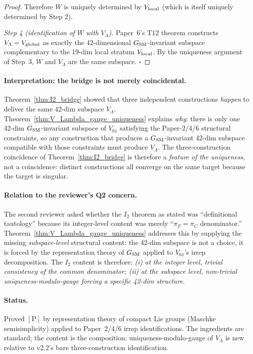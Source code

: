 \documentclass[11pt]{article}
\theoremstyle{plain}
\theoremstyle{definition}
\theoremstyle{remark}
\begin{document}
\begin{proof}
Therefore $W$ is uniquely determined by $V_{\rm local}$ (which is itself uniquely determined by Step 2).

\medskip

\emph{Step 4 (identification of $W$ with $V_\Lambda$).}  Paper~6's T12 theorem constructs $V_\Lambda = V_{\rm global}$ as exactly the 42-dimensional $G_{\rm SM}$-invariant subspace complementary to the 19-dim local stratum $V_{\rm local}$.  By the uniqueness argument of Step~3, $W$ and $V_\Lambda$ are the same subspace.  $\square$
\end{proof}

\paragraph{Interpretation: the bridge is not merely coincidental.}  Theorem~\ref{thm:I2_bridge} showed that three independent constructions \emph{happen} to deliver the same 42-dim subspace $V_\Lambda$.  Theorem~\ref{thm:V_Lambda_gauge_uniqueness} explains \emph{why}: there is only one 42-dim $G_{\rm SM}$-invariant subspace of $V_{61}$ satisfying the Paper-2/4/6 structural constraints, so any construction that produces a $G_{\rm SM}$-invariant 42-dim subspace compatible with those constraints must produce $V_\Lambda$.  The three-construction coincidence of Theorem~\ref{thm:I2_bridge} is therefore a \emph{feature of the uniqueness}, not a coincidence: distinct constructions all converge on the same target because the target is singular.

\paragraph{Relation to the reviewer's Q2 concern.}  The second reviewer asked whether the $I_2$ theorem as stated was ``definitional tautology'' because its integer-level content was merely ``$\pi_F = \pi_C$ denominator.''  Theorem~\ref{thm:V_Lambda_gauge_uniqueness} addresses this by supplying the missing \emph{subspace-level} structural content: the 42-dim subspace is not a choice, it is forced by the representation theory of $G_{\rm SM}$ applied to $V_{61}$'s irrep decomposition.  The $I_2$ content is therefore: \emph{(i) at the integer level, trivial consistency of the common denominator; (ii) at the subspace level, non-trivial uniqueness-modulo-gauge forcing a specific 42-dim structure}.

\paragraph{Status.}  Proved $[\text{P}]$ by representation theory of compact Lie groups (Maschke semisimplicity) applied to Paper~2/4/6 irrep identifications.  The ingredients are standard; the content is the composition: uniqueness-modulo-gauge of $V_\Lambda$ is new relative to v2.2's bare three-construction identification.
\end{document}
